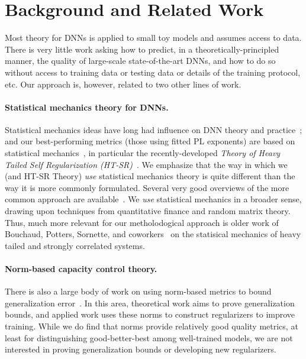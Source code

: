 \section{Background and Related Work}
\label{sxn:background}

Most theory for DNNs is applied to small toy models and assumes access to data.
There is very little work asking how to predict, in a theoretically-principled manner, the quality of large-scale state-of-the-art DNNs, and how to do so without access to training data or testing data or details of the training protocol, etc.
Our 
approach  %
is, however, 
related to 
two  %
other lines of work.


\paragraph{Statistical mechanics theory for DNNs.}

Statistical mechanics ideas have long had influence on DNN theory and practice~\cite{EB01_BOOK, MM17_TR, BKPx20}; and 
our best-performing metrics (those using fitted PL exponents) are based on statistical mechanics~\cite{MM17_TR, MM18_TR, MM19_HTSR_ICML, MM19_KDD, MM20_SDM}, in particular the recently-developed \emph{Theory of Heavy Tailed Self Regularization (HT-SR)}~\cite{MM18_TR, MM19_HTSR_ICML, MM20_SDM}.  
We emphasize that the way in which we (and HT-SR Theory) \emph{use} statistical mechanics theory is quite different than the way it is more commonly formulated.
Several very good overviews of the more common approach are available~\cite{EB01_BOOK, BKPx20}.
We \emph{use} statistical mechanics in a broader sense, drawing upon techniques from quantitative finance and random matrix theory.  %
Thus, much more relevant for our metholodogical approach is older work of Bouchaud, Potters, Sornette, and coworkers~\cite{BouchaudPotters03, SornetteBook, BP11, bun2017} on the statisical mechanics of heavy tailed and strongly correlated systems.


\paragraph{Norm-based capacity control theory.}

There is also a large body of work on using norm-based metrics to bound generalization error~\cite{NTS15, BFT17_TR, LMBx18_TR}.
In this area, theoretical work aims to prove generalization bounds, and applied work uses these norms to construct regularizers to improve training.
While we do find that norms provide relatively good quality metrics, at least for distinguishing good-better-best among well-trained models, we are not interested in proving generalization bounds or developing new regularizers.


